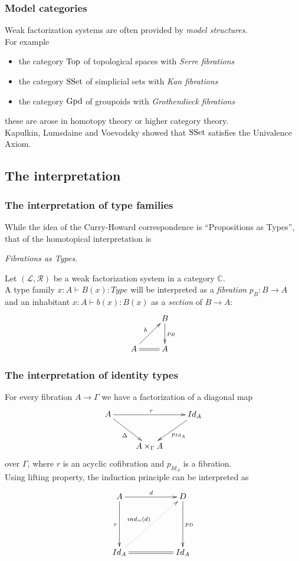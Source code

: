 \documentclass[dvipdfmx]{beamer}
\begin{document}
\begin{frame}
  \frametitle{Model categories}
  Weak factorization systems are often provided
  by {\it model structures}.
  \nocite{Quillen:1967,hovey2007model}
  \\
  For example
  \begin{itemize}
    \item the category ${\rm Top}$ of topological spaces
      with {\it Serre fibrations}
    \item the category ${\rm SSet}$ of simplicial sets
      with {\it Kan fibrations}
    \item the category ${\rm Gpd}$ of groupoids
      with {\it Grothendieck fibrations}
  \end{itemize}
  these are arose in homotopy theory or
  higher category theory.
  \\
  Kapulkin, Lumsdaine and Voevodsky showed that
  ${\rm SSet}$ satisfies the Univalence Axiom.
  \cite{kapulkin2012simplicial,kapulkin2012univalence}
\end{frame}

\subsection{The interpretation}

\begin{frame}
  \frametitle{The interpretation of type families}
  While the idea of the Curry-Howard correspondence is
  ``Propositions as Types'',
  that of the homotopical interpretation is
  \pause
  \begin{center}
    {\it Fibrations as Types}.
  \end{center}
  \pause
  Let $\left( {\mathcal L} , {\mathcal R} \right)$
  be a weak factorization system in a category ${\mathbb C}$.
  \\
  A type family $x : A \vdash B \left( x \right) : Type$
  will be interpreted as a {\it fibration} $p_{B} : B \to A$
  and an inhabitant
  $x : A \vdash b \left( x \right) : B \left( x \right)$
  as a {\it section} of
  $B \to A$:
  \[
    \xymatrix{
      & B \ar[d]^{p_{B}}
      \\
      A \ar@{=}[r] \ar[ur]^{b}
      & A
    }
  \]
\end{frame}

\begin{frame}
  \frametitle{The interpretation of identity types}
  For every fibration $A \to \Gamma$
  we have a factorization of a diagonal map
  \[
    \xymatrix{
      A \ar[rr]^{r} \ar[dr]_{\Delta}
      &
      & Id_{A} \ar[dl]^{p_{Id_A}}
      \\
      & A \times _{\Gamma}  A
      &
    }
  \]
  over $\Gamma$, where $r$ is an acyclic cofibration
  and $p_{Id_A}$ is a fibration.
  \pause
  \\
  Using lifting property,
  the induction principle can be interpreted as
  \[
    \xymatrix{
      A \ar[rr]^{d} \ar[dd]_{r}
      &
      & D \ar[dd]^{p_{D}}
      \\
      & & \\
      Id_{A} \ar@{=}[rr] \ar@{.>}[urur]^{ind_{=} \left( d \right)}
      &
      & Id_{A}
    }
  \]
\end{frame}
\end{document}
